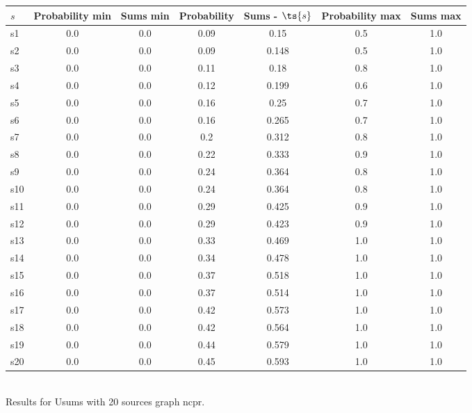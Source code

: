\documentclass{article}
\begin{document}
\noindent\begin{tabular}{|l|c|c|c|c|c|c|}
\hline
$s$& Probability min & Sums min & Probability & Sums - $\ts{s}$ & Probability max & Sums max\\
\hline
s1 &0.0 & 0.0 & 0.09 & 0.15 & 0.5 & 1.0\\
\hline
s2 &0.0 & 0.0 & 0.09 & 0.148 & 0.5 & 1.0\\
\hline
s3 &0.0 & 0.0 & 0.11 & 0.18 & 0.8 & 1.0\\
\hline
s4 &0.0 & 0.0 & 0.12 & 0.199 & 0.6 & 1.0\\
\hline
s5 &0.0 & 0.0 & 0.16 & 0.25 & 0.7 & 1.0\\
\hline
s6 &0.0 & 0.0 & 0.16 & 0.265 & 0.7 & 1.0\\
\hline
s7 &0.0 & 0.0 & 0.2 & 0.312 & 0.8 & 1.0\\
\hline
s8 &0.0 & 0.0 & 0.22 & 0.333 & 0.9 & 1.0\\
\hline
s9 &0.0 & 0.0 & 0.24 & 0.364 & 0.8 & 1.0\\
\hline
s10 &0.0 & 0.0 & 0.24 & 0.364 & 0.8 & 1.0\\
\hline
s11 &0.0 & 0.0 & 0.29 & 0.425 & 0.9 & 1.0\\
\hline
s12 &0.0 & 0.0 & 0.29 & 0.423 & 0.9 & 1.0\\
\hline
s13 &0.0 & 0.0 & 0.33 & 0.469 & 1.0 & 1.0\\
\hline
s14 &0.0 & 0.0 & 0.34 & 0.478 & 1.0 & 1.0\\
\hline
s15 &0.0 & 0.0 & 0.37 & 0.518 & 1.0 & 1.0\\
\hline
s16 &0.0 & 0.0 & 0.37 & 0.514 & 1.0 & 1.0\\
\hline
s17 &0.0 & 0.0 & 0.42 & 0.573 & 1.0 & 1.0\\
\hline
s18 &0.0 & 0.0 & 0.42 & 0.564 & 1.0 & 1.0\\
\hline
s19 &0.0 & 0.0 & 0.44 & 0.579 & 1.0 & 1.0\\
\hline
s20 &0.0 & 0.0 & 0.45 & 0.593 & 1.0 & 1.0\\
\hline
\end{tabular}\\

\noindent Results for Usums with 20 sources graph ncpr.
\end{document}
